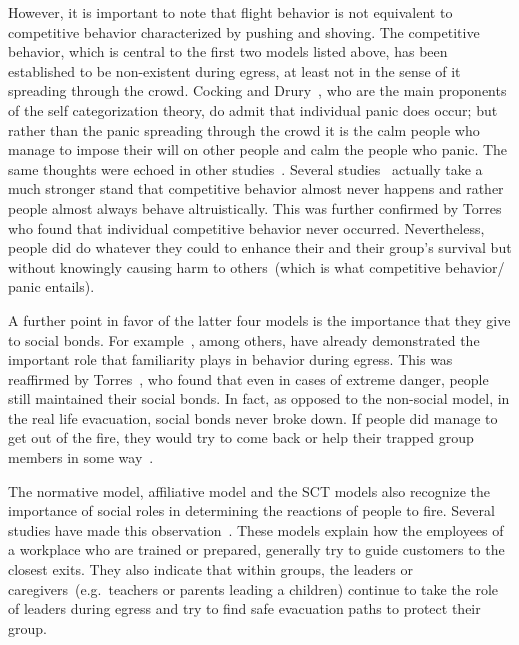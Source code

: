 However, it is important to note that flight behavior is not equivalent to competitive behavior characterized by pushing and shoving. The competitive behavior, which is central to the first two models listed above, has been established to be non-existent during egress, at least not in the sense of it spreading through the crowd. Cocking and Drury~\cite{Cocking:2005uc}, who are the main proponents of the self categorization theory, do admit that individual panic does occur; but rather than the panic spreading through the crowd it is the calm people who manage to impose their will on other people and calm the people who panic. The same thoughts were echoed in other studies~\cite{Paulsen:1984ti,Sime:1983uy,Schadschneider:2008cz}. Several studies~\cite{Sime:1983uy,Paulsen:1984ti,Drury:2009ga} actually take a much stronger stand that competitive behavior almost never happens and rather people almost always behave altruistically. This was further confirmed by Torres~\cite{Torres:2010tj} who found that individual competitive behavior never occurred. Nevertheless, people did do whatever they could to enhance their and their group's survival but without knowingly causing harm to others~(which is what competitive behavior/ panic entails).

A further point in favor of the latter four models is the importance that they give to social bonds. For example~\cite{Cornwell:2003uo,Chertkoff:1996vw,Andree:2008td}, among others, have already demonstrated the important role that familiarity plays in behavior during egress. This was reaffirmed by Torres~\cite{Torres:2010tj}, who found that even in cases of extreme danger, people still maintained their social bonds. In fact, as opposed to the non-social model, in the real life evacuation, social bonds never broke down. If people did manage to get out of the fire, they would try to come back or help their trapped group members in some way~\cite{Torres:2010tj,Kobes:2009jx}.

The normative model, affiliative model and the SCT models also recognize the importance of social roles in determining the reactions of people to fire. Several studies have made this observation~\cite{Proulx:2003tc,Proulx:2001we,Paulsen:1984ti,Sandberg:1997tw,Cocking:2008vv,Tong:1985wn}. These models explain how the employees of a workplace who are trained or prepared, generally try to guide customers to the closest exits. They also indicate that within groups, the leaders or caregivers~(e.g.\ teachers or parents leading a children) continue to take the role of leaders during egress and try to find safe evacuation paths to protect their group.

